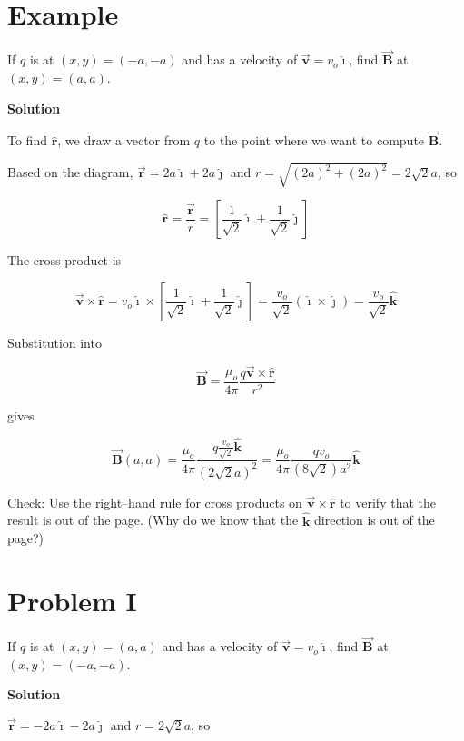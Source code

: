 \documentclass{article}
\newcommand{\ihat}[0]{\hat{\boldsymbol{\imath}}}
\newcommand{\jhat}[0]{\hat{\boldsymbol{\jmath}}}
\newcommand{\khat}[0]{\hat{\boldsymbol{k}}}
\newcommand{\bfvec}[1]{\vec{\mathbf{#1}}}
\begin{document}
\else

\newpage
\fi

\section{Example}

If $q$ is at $(x,y)=(-a,-a)$ and has a velocity of $\bfvec{v}=v_o\ihat$, find $\bfvec{B}$ at $(x,y)=(a,a)$.

\textbf{Solution}

To find $\hat{\mathbf{r}}$, we draw a vector from $q$ to the point where we want to compute $\bfvec{B}$.



Based on the diagram, $\bfvec{r}=2a\ihat + 2a\jhat$ and $r = \sqrt{(2a)^2+(2a)^2}=2\sqrt{2}a$, so

$$\hat{\mathbf{r}}=\frac{\bfvec{r}}{r} = \left[\frac{1}{\sqrt{2}}\ihat + \frac{1}{\sqrt{2}}\jhat\right]$$

The cross-product is

$$\bfvec{v}\times\hat{\mathbf{r}} = v_o\ihat\times\left[\frac{1}{\sqrt{2}}\ihat + \frac{1}{\sqrt{2}}\jhat\right] = \frac{v_o}{\sqrt{2}}(\ihat\times\jhat) = \frac{v_o}{\sqrt{2}}\khat$$

Substitution into 

$$\bfvec{B} = \frac{\mu_o}{4\pi}\frac{q\bfvec{v}\times\hat{\mathbf{r}}}{r^2}$$

gives

$$\bfvec{B}(a,a) = \frac{\mu_o}{4\pi} \frac{q\frac{v_o}{\sqrt{2}}\khat}{(2\sqrt{2}a)^2} = \frac{\mu_o}{4\pi} \frac{qv_o}{(8\sqrt{2})a^2}\khat$$

Check: Use the right--hand rule for cross products on $\bfvec{v}\times\hat{\mathbf{r}}$ to verify that the result is out of the page. (Why do we know that the $\khat$ direction is out of the page?)

\ifsolutions

\else

\newpage
\fi

\section{Problem I}

If $q$ is at $(x,y)=(a,a)$ and has a velocity of $\bfvec{v}=v_o\ihat$, find $\bfvec{B}$ at $(x,y)=(-a,-a)$.

\ifsolutions
\textbf{Solution}

$\bfvec{r}=-2a\ihat - 2a\jhat$ and $r=2\sqrt{2}a$, so
\end{document}
